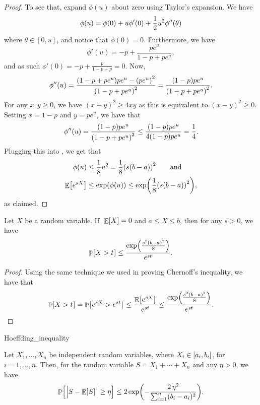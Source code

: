 \begin{proof}
    To see that, expand $\phi(u)$ about zero using Taylor's
    expansion. We have
    \begin{equation}
        \phi(u) = \phi(0)+u\phi'(0)+\frac{1}{2}u^{2}\phi''(\theta)
        \eqlab{phi:u}
    \end{equation}
    where $\theta\in [0,u]$, and notice
    that $\phi(0)=0$.
    Furthermore, we have
    \[
    \phi'(u) = -p + \frac{pe^u}{1-p + pe^u},
    \]
    and as such $\phi'(0) = -p + \frac{p}{1-p + p } = 0$.
    Now,
    \[
    \phi''(u) = \frac{\pth{ 1-p + pe^u}pe^u - \pth{pe^u}^2 }{\pth{1-p
          + pe^u}^2} = \frac{\pth{ 1-p}pe^u }{\pth{1-p + pe^u}^2}.
    \]
    For any $x, y \geq 0$, we have $(x+y)^2 \geq 4xy$ as this is
    equivalent to $(x-y)^2 \geq 0$. Setting $x = 1-p$ and $y = pe^u$,
    we have that
    \[
    \phi''(u) =
    \frac{\pth{ 1-p}pe^u }{\pth{1-p + pe^u}^2}
    \leq
    \frac{\pth{ 1-p}pe^u }{4\pth{ 1-p}pe^u} = \frac{1}{4}.
    \]
    Plugging this into , we get that
    \begin{align*}
        \phi(u) &\leq \frac{1}{8}u^{2} = \frac{1}{8}\pth{s(b-a)}^{2}
        \qquad\text{and} \\
        \Ex{e^{sX}} &\leq \exp \pth{ \phi(u) } \leq
        \exp\pth{ \frac{1}{8}\pth{s(b-a)}^{2}},
    \end{align*}
    as claimed.
\end{proof}

\begin{lemma}
    Let $X$ be a random variable.
    If $\;\mathop{\mathbb{E}}\!\left[ {X} \right]=0$ and $a\le X\le b$, then for any $s > 0$, we have
    \[
    \Prob{ X > t \MakesBig\ts }%
    \leq%
    \frac{\exp \pth{\frac{s^{2}(b-a)^{2}}{8}}} {e^{st}}.
    \]
\end{lemma}

\begin{proof}
    Using the same technique we used in proving Chernoff's inequality,
    we have that
    \begin{align*}
        \Prob{ X > t \MakesBig\ts } = \Prob{ e^{sX} > e^{st} }%
        \leq%
        \frac{\Ex{ e^{sX} }}{e^{st}} \leq \frac{\exp
           \pth{\frac{s^{2}(b-a)^{2}}{8}}} {e^{st}}.
    \end{align*}
\end{proof}


\begin{fragment}{Hoeffding_inequality}
\begin{theorem}
    Let $X_1, \dots, X_n$ be independent random variables, where $X_i
    \in \left[ {a_i, b_i} \right]$, for $i=1,\ldots, n$.  Then, for the random
    variable $ S = X_1 + \cdots + X_n$ and any $\eta > 0$, we have
    \[
        \Prob{\ts \cardin{\Bigl. S - \Ex{\ts S\MakesBig } \ts } \geq
           \eta} \leq 2\exp \pth{ - \frac{2\,\eta^2}{\sum_{i=1}^n (b_i
              - a_i)^2} }.
    \]


\end{theorem}
\end{fragment}


